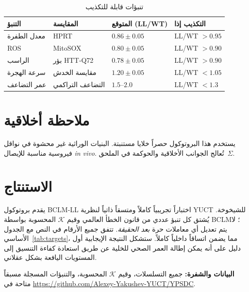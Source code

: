 \documentclass[11pt,a4paper]{article}
\newcommand{\REL}{\mathcal{K}}          %
\begin{document}
	\begin{table}[H]
		\centering
		\caption{تنبؤات قابلة للتكذيب}
		\label{tab:predictions}
		\begin{tabular}{@{}llll@{}}
			\toprule
			\textbf{التنبؤ} & \textbf{المقايسة} & \textbf{المتوقع (LL/WT)} & \textbf{التكذيب إذا} \\
			\midrule
			معدل الطفرة       & HPRT           & \(0.86 \pm 0.05\) & LL/WT \(> 0.95\) \\
			ROS               & MitoSOX        & \(0.80 \pm 0.05\) & LL/WT \(> 0.90\) \\
			الراسب            & بؤر HTT‑Q72    & \(0.78 \pm 0.05\) & LL/WT \(> 0.90\) \\
			سرعة الهجرة       & مقايسة الخدش   & \(1.20 \pm 0.05\) & LL/WT \(< 1.05\) \\
			عمر التضاعف       & التضاعف التراكمي & \(1.5\)–\(2.0\)   & LL/WT \(< 1.3\) \\
			\bottomrule
		\end{tabular}
	\end{table}
	
	\section{ملاحظة أخلاقية}
	\label{sec:ethics}
	يستخدم هذا البروتوكول حصراً خلايا مستنبتة. البنيات الوراثية غير محشوة في نواقل فيروسية مناسبة للإيصال \textit{in vivo}. تُعالج الجوانب الأخلاقية والحوكمة في الملحق~\(\Sigma\).
	
	\section{الاستنتاج}
	يقدم بروتوكول BCLM‑LL اختباراً تجريبياً كاملاً ومتسقاً ذاتياً لنظرية YUCT للشيخوخة. يُشتق كل تنبؤ عددي من قانون الخطأ العالمي وقيم \(\REL\) المحسوبة بواسطة BCLM؛ لا يتم تعديل أي معاملات حرة \textit{بعد الحقيقة}. تتفق جميع الأرقام في النص مع الجدول الأساسي~\ref{tab:targets}، مما يضمن اتساقاً داخلياً كاملاً. ستشكل النتيجة الإيجابية أول دليل على أنه يمكن إطالة العمر الصحي للخلية عن طريق استعادة كفاءة التنسيق إلى المستويات اليافعة بشكل عقلاني.
	
	\vspace{0.5cm}
	\noindent\textbf{البيانات والشفرة:} جميع التسلسلات، وقيم \(\REL\) المحسوبة، والتنبؤات المسجلة مسبقاً متاحة في \url{https://github.com/Alexey-Yakushev-YUCT/YPSDC}.
	
\end{document}
